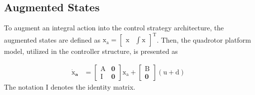 \documentclass[3p]{elsarticle}
\begin{document}
\subsection{Augmented States}
\noindent To augment an integral action into the control strategy architecture, the augmented states are defined as $\boldsymbol{\mathrm{x_{a}}} = \begin{bmatrix}
    \boldsymbol{\mathrm{x}} &
    \displaystyle\int\boldsymbol{\mathrm{x}}
\end{bmatrix}^\mathrm{T}$. Then, the quadrotor platform model, utilized in the controller structure, is presented as

\begin{equation}\label{systemlqidg}
    \begin{split}
        \boldsymbol{\dot{\mathrm{x}}_a} &= \begin{bmatrix}
            \boldsymbol{\mathrm{A}} & \boldsymbol{0}\\
            \boldsymbol{\mathrm{I}} & \boldsymbol{0}
        \end{bmatrix}\boldsymbol{\mathrm{x_a}} + \begin{bmatrix}
            \boldsymbol{\mathrm{B}}\\
            \boldsymbol{0}
        \end{bmatrix}
         \left(\boldsymbol{\mathrm{u}} + \boldsymbol{\mathrm{d}}\right)%
    \end{split}
\end{equation}
The notation $\boldsymbol{\mathrm{I}}$ denotes the identity matrix.
\end{document}
